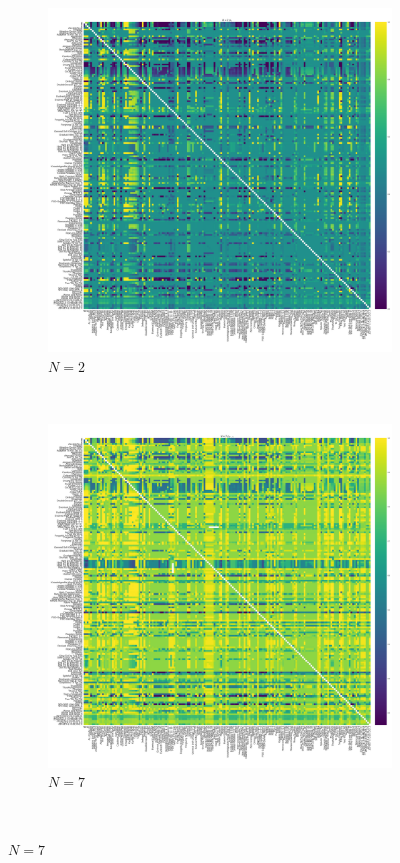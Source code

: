 \documentclass{article}
\begin{document}
\begin{figure}[!hbtp]
    \centering
    \begin{subfigure}[t]{.3\textwidth}
        \centering
        \includegraphics[width=.8\textwidth]{../img/fixation_heatmap_2_invade.pdf}
        \caption{\(N=2\)}
    \end{subfigure}%
    ~
    \begin{subfigure}[t]{.3\textwidth}
        \centering
        \includegraphics[width=.8\textwidth]{../img/fixation_heatmap_7_resist.pdf}
        \caption{\(N=7\)}
    \end{subfigure}%
    ~

\end{figure}
\end{document}
